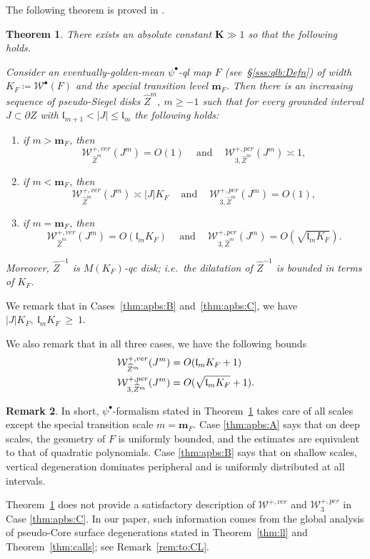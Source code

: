 \documentclass[11pt, reqno]{amsart}
\numberwithin{equation}{section}
\theoremstyle{plain}
\newtheorem{theorem}{Theorem}[section]
\theoremstyle{theorem}
\theoremstyle{plain}
\theoremstyle{definition}
\newtheorem{rmk}[theorem]{Remark}
\numberwithin{figure}{section}
\renewcommand{\sp}{{\ \ }}
\newcommand{\Width}{{\mathcal W}}
\newcommand{\wZ}{{\widehat Z}}
\newcommand{\bK}{{\mathbf K}}
\newcommand{\bbm}{{\mathbf m}}
\newcommand{\length}{{\mathfrak l}}
\begin{document}
The following theorem is proved in \cite[Theorem 1.3]{DLL25}.
\begin{theorem}\label{thm:apbs}
There exists an absolute constant $\bK\gg 1$ so that the following holds.

Consider an eventually-golden-mean $\psi^\bullet$-ql map $F$ (see~\S\ref{sss:qlb:Defn}) of width $K_F\coloneqq \Width^\bullet(F)$ and the special transition level $\bbm_F$. Then there is an increasing sequence of pseudo-Siegel disks $\wZ^m,\  m\ge -1$ such that for every grounded interval $J\subset \partial Z$ with $\length_{m+1}< |J|\le \length_{m}$ the following holds:
\begin{enumerate}[ label=(\Alph*)]
    \item\label{thm:apbs:A} if $m> \bbm_F$, then \[\Width_{\wZ^m}^{+,ver} (J^m)=O(1) \sp\sp\text{ and }\sp\sp \Width_{3,\wZ^m}^{+,per} (J^m)\asymp 1,\]
    \item\label{thm:apbs:B} if $m< \bbm_F$, then 
    \[\Width_{\wZ^m}^{+,ver} (J^m)\asymp |J|K_F \sp\sp\text{ and }\sp\sp \Width_{3,\wZ^m}^{+,per} (J^m)=O(1),\]
    \item \label{thm:apbs:C} if $m= \bbm_F$, then 
    \[\Width_{\wZ^m}^{+,ver} (J^m)= O(\length_m K_F)  \sp\sp\text{ and }\sp\sp \Width_{3,\wZ^m}^{+,per} (J^m)=O(\sqrt{\length_m K_F }).\]
\end{enumerate}

Moreover, $\wZ^{-1}$ is $M(K_F)$-qc disk; i.e.~the dilatation of $\wZ^{-1}$ is bounded in terms of $K_F$.

\end{theorem}
We remark that in Cases~\ref{thm:apbs:B} and~\ref{thm:apbs:C}, we have
$ |J|K_F, \ \length_m K_F \  \ge\  1  $.

We also remark that in all three cases, we have the following bounds
\begin{align}
\label{eqn:VandP}
\begin{split}
    \Width_{\wZ^m}^{+,ver} (J^m)&= O(\length_m K_F +1) \vspace{0.3cm} \\ \Width_{3,\wZ^m}^{+,per} (J^m)&=O(\sqrt{\length_m K_F }+1).
\end{split}
\end{align}


\begin{rmk}
\label{rem:thm:info}   
In short, $\psi^\bullet$-formalism stated in Theorem~\ref{thm:apbs} takes care of all scales except the special transition scale $m=\bbm_F$.  Case \ref{thm:apbs:A} says that on deep scales, the geometry of $F$ is uniformly bounded, and the estimates are equivalent to that of quadratic polynomials. Case \ref{thm:apbs:B} says that on shallow scales, vertical degeneration dominates peripheral and is uniformly distributed at all intervals.

Theorem~\ref{thm:apbs} does not provide a satisfactory description of $\Width^{+,ver}$ and $\Width_{3}^{+,per}$ in Case \ref{thm:apbs:C}. In our paper, such information comes from the global analysis of pseudo-Core surface degenerations stated in Theorem~\ref{thm:ll} and Theorem~\ref{thm:calls}; see Remark~\ref{rem:to:CL}.
\end{rmk}
\end{document}

